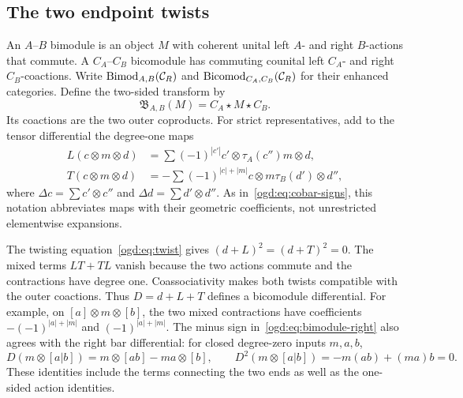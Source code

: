 \subsection{The two endpoint twists}

An\label{ogd:def:bimodule-and-bicomodule-categories}\label{ogd:def:enhanced-bicomodule-category} \(A\)--\(B\) bimodule is an object \(M\) with coherent unital left \(A\)- and right \(B\)-actions that commute.
A \(C_A\)--\(C_B\) bicomodule has commuting counital left \(C_A\)- and right \(C_B\)-coactions.
Write \(\operatorname{Bimod}_{A,B}(\mathcal C_R)\) and \(\operatorname{Bicomod}_{C_A,C_B}(\mathcal C_R)\) for their enhanced categories.
Define the two-sided transform by
\begin{equation}\label{ogd:eq:double-bar}
 \mathfrak B_{A,B}(M)=C_A\star M\star C_B.
\end{equation}
Its coactions are the two outer coproducts.
For strict representatives, add to the tensor differential the degree-one maps
\begin{align}
 L(c\otimes m\otimes d)
  &=\sum(-1)^{|c'|}c'\otimes\tau_A(c'')m\otimes d,
       \label{ogd:eq:bimodule-left}\\
 T(c\otimes m\otimes d)
  &=-\sum(-1)^{|c|+|m|}c\otimes m\tau_B(d')\otimes d'',
       \label{ogd:eq:bimodule-right}
\end{align}
where \(\Delta c=\sum c'\otimes c''\) and \(\Delta d=\sum d'\otimes d''\).
As in~\eqref{ogd:eq:cobar-signs}, this notation abbreviates maps with their geometric coefficients, not unrestricted elementwise expansions.

The twisting equation~\eqref{ogd:eq:twist} gives \((d+L)^2=(d+T)^2=0\).
The mixed terms \(LT+TL\) vanish because the two actions commute and the contractions have degree one.
Coassociativity makes both twists compatible with the outer coactions.
Thus \(D=d+L+T\) defines a bicomodule differential.
For example, on \([a]\otimes m\otimes[b]\), the two mixed contractions have coefficients
\(-(-1)^{|a|+|m|}\) and \(( -1)^{|a|+|m|}\).
The minus sign in~\eqref{ogd:eq:bimodule-right} also agrees with the right bar differential: for closed degree-zero inputs \(m,a,b\),
\[
 D(m\otimes[a|b])
   =m\otimes[ab]-ma\otimes[b],\qquad
 D^2(m\otimes[a|b])=-m(ab)+(ma)b=0.
\]
These identities include the terms connecting the two ends as well as the one-sided action identities.

